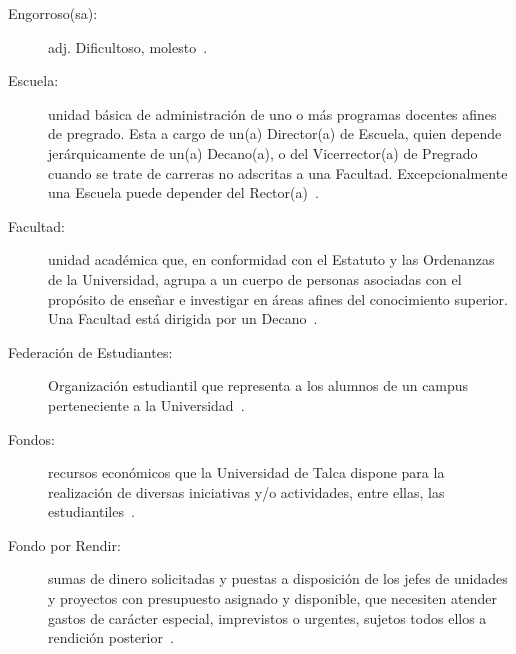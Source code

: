\begin{glosario}
	\item 	\begin{description}
		\item[Engorroso(sa):] adj. Dificultoso, molesto~\cite{14}.
	\end{description}

	\item 	\begin{description}
		\item[Escuela:] unidad básica de administración de uno o más programas docentes afines de pregrado. Esta a cargo de un(a) Director(a) de Escuela, quien depende jerárquicamente de un(a) Decano(a), o del Vicerrector(a) de Pregrado cuando se trate de carreras no adscritas a una Facultad. Excepcionalmente una Escuela puede depender del Rector(a)~\cite{1}.
	\end{description}

	\item 	\begin{description}
		\item[Facultad:] unidad académica que, en conformidad con el Estatuto y las Ordenanzas de la Universidad, agrupa a un cuerpo de personas asociadas con el propósito de enseñar e investigar en áreas afines del conocimiento superior. Una Facultad está dirigida por un Decano~\cite{1}.
	\end{description}

	\item 	\begin{description}
		\item[Federación de Estudiantes:] Organización estudiantil que representa a los alumnos de un campus perteneciente a la Universidad~\cite{2}.
	\end{description}

	\item 	\begin{description}
		\item[Fondos:] recursos  económicos  que  la  Universidad  de  Talca  dispone  para  la  realización  de diversas iniciativas y/o actividades, entre ellas, las estudiantiles~\cite{1}.
	\end{description}

	\item 	\begin{description}
			\item[Fondo por Rendir:] sumas de dinero solicitadas y puestas a disposición de los jefes de unidades y proyectos con presupuesto asignado y disponible, que necesiten atender gastos de carácter especial, imprevistos o urgentes, sujetos todos ellos a rendición posterior~\cite{1}.
		\end{description}
	

\end{glosario}
